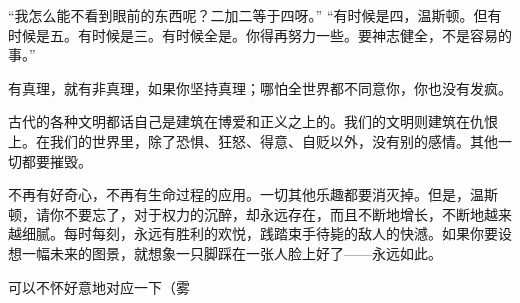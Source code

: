 \documentclass{beamer}
\begin{document}
  \begin{frame}
    “我怎么能不看到眼前的东西呢？二加二等于四呀。” “有时候是四，温斯顿。但有时候是五。有时候是三。有时候全是。你得再努力一些。要神志健全，不是容易的事。” 

    有真理，就有非真理，如果你坚持真理；哪怕全世界都不同意你，你也没有发疯。 

    古代的各种文明都话自己是建筑在博爱和正义之上的。我们的文明则建筑在仇恨上。在我们的世界里，除了恐惧、狂怒、得意、自贬以外，没有别的感情。其他一切都要摧毁。 

    不再有好奇心，不再有生命过程的应用。一切其他乐趣都要消灭掉。但是，温斯顿，请你不要忘了，对于权力的沉醉，却永远存在，而且不断地增长，不断地越来越细腻。每时每刻，永远有胜利的欢悦，践踏束手待毙的敌人的快澸。如果你要设想一幅未来的图景，就想象一只脚踩在一张人脸上好了——永远如此。
  \end{frame}
  \begin{frame}
    可以不怀好意地对应一下（雾
  \end{frame}
\end{document}
